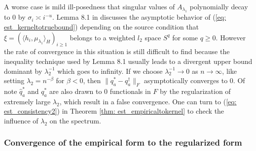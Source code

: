 \begin{remark}
    \label{rem: est_worseratekernelembeddedtotrue}
    A worse case is mild ill-posedness that singular values of $A_{\lambda_1}$ polynomially decay to 0 by $\sigma_i\asymp i^{-u}$. 
    Lemma 8.1 in \cite{Knapik2011Bayesian} discusses the asymptotic behavior of (\ref{eq: est_kerneltotruebound}) depending on the source condition 
    that $\xi=(\langle h_i,\mu_{\lambda_1}\rangle_H)_{i\geq 1}$ belongs to a weighted $l_2$ space $S^q$ for some $q\geq 0$. 
    However the rate of convergence in this situation is still difficult to find because the inequality technique used by Lemma 8.1 usually leads to a divergent upper bound dominant by $\lambda_2^{-1}$ 
    which goes to infinity. If we choose $\lambda_2^{-1}\rightarrow 0$ as $n\rightarrow\infty$, like setting $\lambda_2=n^{-\beta}$ for $\beta<0$,
    then $\|q_a^*-q_a^{\dagger}\|_F$ asymptotically converges to 0. 
    Of note $\widehat{q}_a^*$ and $q_a^*$ are also drawn to 0 functionals in $F$ by 
    the regularization of extremely large $\lambda_2$, 
    which result in a false convergence. 
    One can turn to (\ref{eq: est_consistency2}) in Theorem \ref{thm: est_empiricaltokernel} to check the influence of $\lambda_2$ on the spectrum.
\end{remark}

\subsubsection{Convergence of the empirical form to the regularized form}

